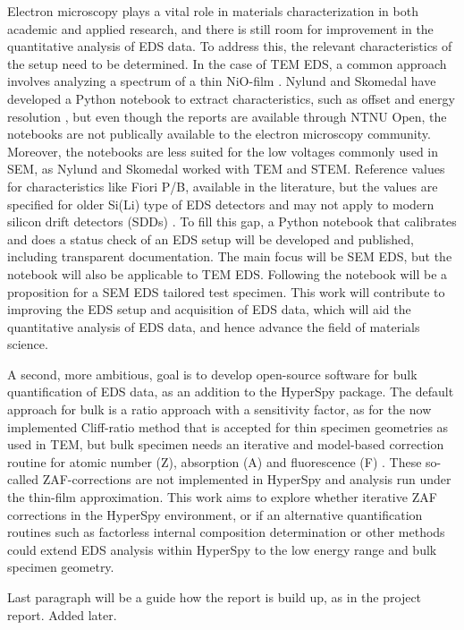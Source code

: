 Electron microscopy plays a vital role in materials characterization in both academic and applied research, and there is still room for improvement in the quantitative analysis of EDS data.
To address this, the relevant characteristics of the setup need to be determined.
In the case of TEM EDS, a common approach involves analyzing a spectrum of a thin NiO-film \cite{egerton_nio_characterization_1994,ted_pella_nio_tem_2019}.
Nylund \cite{nylund_evaluation_2017} and Skomedal \cite{skomedal_improving_2022} have developed a Python notebook to extract characteristics, such as offset and energy resolution , but even though the reports are available through NTNU Open, the notebooks are not publically available to the electron microscopy community.
Moreover, the notebooks are less suited for the low voltages commonly used in SEM, as Nylund and Skomedal worked with TEM and STEM.
Reference values for characteristics like Fiori P/B,  available in the literature, but the values are specified for older Si(Li) type of EDS detectors and may not apply to modern silicon drift detectors (SDDs) \cite{sdd_lechner_2001}.
To fill this gap, a Python notebook that calibrates and does a status check of an EDS setup will be developed and published, including transparent documentation.
The main focus will be SEM EDS, but the notebook will also be applicable to TEM EDS.
Following the notebook will be a proposition for a SEM EDS tailored test specimen.
This work will contribute to improving the EDS setup and acquisition of EDS data, which will aid the quantitative analysis of EDS data, and hence advance the field of materials science.




A second, more ambitious, goal is to develop open-source software for bulk quantification of EDS data, as an addition to the HyperSpy package.
The default approach for bulk is a ratio approach with a sensitivity factor, as for the now implemented Cliff-ratio method that is accepted for thin specimen geometries as used in TEM, but bulk specimen needs an iterative and model-based correction routine for atomic number (Z), absorption (A) and fluorescence (F) \cite{goldstein_scanning_2018}.
These so-called ZAF-corrections are not implemented in HyperSpy and analysis run under the thin-film approximation.
This work aims to explore whether iterative ZAF corrections in the HyperSpy environment, or if an alternative quantification routines such as factorless internal composition determination \cite{nilsen_factorless_2021}  or other methods could extend EDS analysis within HyperSpy to the low energy range and bulk specimen geometry.





Last paragraph will be a guide how the report is build up, as in the project report. Added later.









